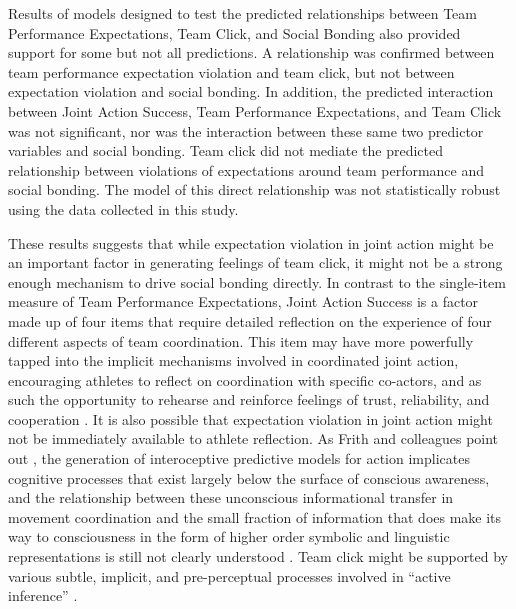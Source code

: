   Results of models designed to test the predicted relationships between Team Performance Expectations, Team Click, and Social Bonding also provided support for some but not all predictions. A relationship was confirmed between team performance expectation violation and team click, but not between expectation violation and social bonding. In addition, the predicted interaction between Joint Action Success, Team Performance Expectations, and Team Click was not significant, nor was the interaction between these same two predictor variables and social bonding.  Team click did not mediate the predicted relationship between violations of expectations around team performance and social bonding. The model of this direct relationship was not statistically robust using the data collected in this study.

  These results suggests that while expectation violation in joint action might be an important factor in generating feelings of team click, it might not be a strong enough mechanism to drive social bonding directly.  In contrast to the single-item measure of Team Performance Expectations, Joint Action Success is a factor made up of four items that require detailed reflection on the experience of four different aspects of team coordination.  This item may have more powerfully tapped into the implicit mechanisms involved in coordinated joint action, encouraging athletes to reflect on coordination with specific co-actors, and as such the opportunity to rehearse and reinforce feelings of trust, reliability, and cooperation \citep{Reddish2013a}.  It is also possible that expectation violation in joint action might not be immediately available to athlete reflection.
  As Frith and colleagues point out \textcite{Frith2007,Frith2010,Clark2013}, the generation of interoceptive predictive models for action implicates cognitive processes that exist largely below the surface of conscious awareness, and the relationship between these unconscious informational transfer in movement coordination and the small fraction of information that does make its way to consciousness in the form of higher order symbolic and linguistic representations is still not clearly understood \citep{Semin2008}. Team click might be supported by various subtle, implicit, and pre-perceptual processes involved in ``active inference'' \citep{Schmidt2011}.

